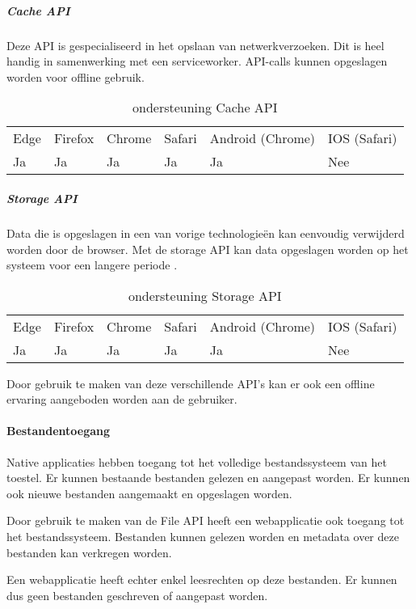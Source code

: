 	
	\subparagraph{Cache API}
	Deze API is gespecialiseerd in het opslaan van netwerkverzoeken. Dit is heel handig in samenwerking met een serviceworker. API-calls kunnen opgeslagen worden voor offline gebruik.
	\autocite{vanKesteren2020}
	
	\begin{table}[]
			\begin{tabular}{llllll}
				Edge & Firefox & Chrome & Safari & Android (Chrome) & IOS (Safari) \\
				Ja   & Ja      &  Ja     & Ja     & Ja               & Nee          
			\end{tabular}	
			\caption{ondersteuning Cache API}
			\label{ondersteuning Cache API}
	\end{table}
	
	
	\subparagraph{Storage API}
	Data die is opgeslagen in een van vorige technologieën kan eenvoudig verwijderd worden door de browser. Met de storage API kan data opgeslagen worden op het systeem voor een langere periode .
	\autocite{Mozilla2020b}
	
	\begin{table}[]
		\begin{tabular}{llllll}
			Edge & Firefox & Chrome & Safari & Android (Chrome) & IOS (Safari) \\
			Ja   & Ja      &  Ja     & Ja     & Ja               & Nee          
		\end{tabular}	
		\caption{ondersteuning Storage API}
		\label{ondersteuning Storage API}
	\end{table}
	
	
	
Door gebruik te maken van deze verschillende API’s kan er ook een offline ervaring aangeboden worden aan de gebruiker. 
	
\paragraph{Bestandentoegang}

Native applicaties hebben toegang tot het volledige bestandssysteem van het toestel. Er kunnen bestaande bestanden gelezen en aangepast worden. Er kunnen ook nieuwe bestanden aangemaakt en opgeslagen worden.

Door gebruik te maken van de File API \autocite{Kruisselbrink2020} heeft een webapplicatie ook toegang tot het bestandssysteem. Bestanden kunnen gelezen worden en metadata over deze bestanden kan verkregen worden.

Een webapplicatie heeft echter enkel leesrechten op deze bestanden. Er kunnen dus geen bestanden geschreven of aangepast worden.

